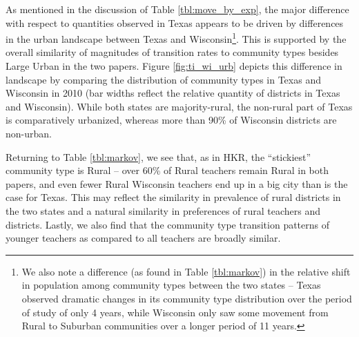 \documentclass[12pt,]{article}
\let\rmarkdownfootnote\footnote%
\def\footnote{\protect\rmarkdownfootnote}
\begin{document}
As mentioned in the discussion of Table \ref{tbl:move_by_exp}, the major
difference with respect to quantities observed in Texas appears to be
driven by differences in the urban landscape between Texas and
Wisconsin\footnote{We also note a difference (as found in Table
  \ref{tbl:markov}) in the relative shift in population among community
  types between the two states -- Texas observed dramatic changes in its
  community type distribution over the period of study of only 4 years,
  while Wisconsin only saw some movement from Rural to Suburban
  communities over a longer period of 11 years.}. This is supported by
the overall similarity of magnitudes of transition rates to community
types besides Large Urban in the two papers. Figure \ref{fig:ti_wi_urb}
depicts this difference in landscape by comparing the distribution of
community types in Texas and Wisconsin in 2010 (bar widths reflect the
relative quantity of districts in Texas and Wisconsin). While both
states are majority-rural, the non-rural part of Texas is comparatively
urbanized, whereas more than 90\% of Wisconsin districts are non-urban.

Returning to Table \ref{tbl:markov}, we see that, as in HKR, the
``stickiest'' community type is Rural -- over 60\% of Rural teachers
remain Rural in both papers, and even fewer Rural Wisconsin teachers end
up in a big city than is the case for Texas. This may reflect the
similarity in prevalence of rural districts in the two states and a
natural similarity in preferences of rural teachers and districts.
Lastly, we also find that the community type transition patterns of
younger teachers as compared to all teachers are broadly similar.
\end{document}
